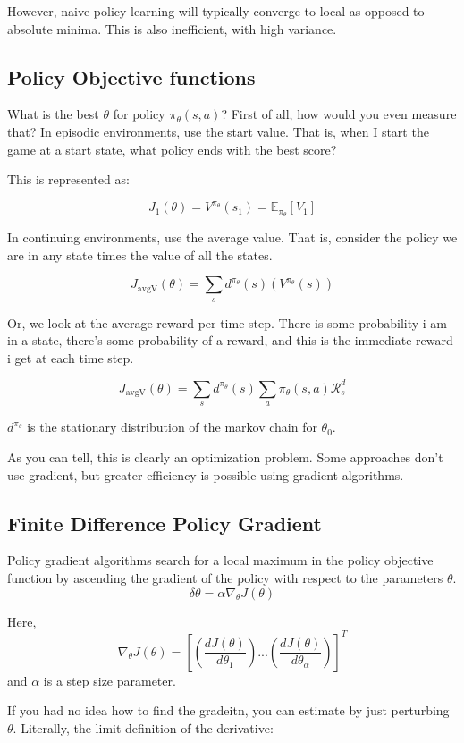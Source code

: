 \documentclass[10pt, oneside]{article}
\theoremstyle{definition}
\begin{document}
However, naive policy learning will typically converge to local as opposed to absolute minima. This is also inefficient, with high variance. 

\subsection{Policy Objective functions}
What is the best $\theta$ for policy $\pi_\theta(s,a)$? First of all, how would you even measure that?
In episodic environments, use the start value. 
That is, when I start the game at a start state, what policy ends with the best score?

This is represented as:

\[J_1(\theta) = V^{\pi_\theta}(s_1) = \mathbb{E}_{\pi_\theta}[V_1]   \]

In continuing environments, use the average value. 
That is, consider the policy we are in any state times the value of all the states.

\[J_{\text{avgV}}(\theta) = \sum_s{d^{\pi_\theta}(s)(V^{\pi_\theta}(s)) }  \]


Or, we look at the average reward per time step. There is some probability i am in a state, there's some probability of a reward, and this is the immediate reward i get at each time step. 

\[J_{\text{avgV}}(\theta) = \sum_s{d^{\pi_\theta}(s)\sum_a{\pi_\theta}(s,a)\mathcal{R}_s^d }  \]

$d^{\pi_\theta}$ is the stationary distribution of the markov chain for $\theta_0$.

As you can tell, this is clearly an optimization problem. Some approaches don't use gradient, but greater efficiency is possible using gradient algorithms. 
\subsection{Finite Difference Policy Gradient}
Policy gradient algorithms search for a local maximum in the policy objective function by ascending the gradient of the policy with respect to the parameters $\theta$. 
\[\delta\theta = \alpha \nabla_\theta J(\theta)\]  

Here, 
\[\nabla_\theta J(\theta) = [(\frac{dJ(\theta)}{d\theta_1})... (\frac{dJ(\theta)}{d\theta_\alpha})]^T  \]
and $\alpha$ is a step size parameter. 

If you had no idea how to find the gradeitn, you can estimate by just perturbing $\theta$. Literally, the limit definition of the derivative:
\end{document}
